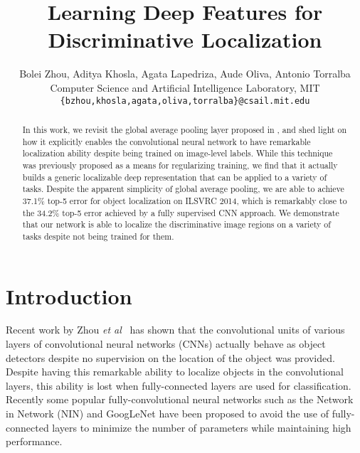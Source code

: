 \documentclass[10pt,twocolumn,letterpaper]{article}
\begin{document}
\title{Learning Deep Features for Discriminative Localization}

\author{
Bolei Zhou, Aditya Khosla, Agata Lapedriza, Aude Oliva, Antonio Torralba \\
Computer Science and Artificial Intelligence Laboratory, MIT\\
\texttt{\{bzhou,khosla,agata,oliva,torralba\}@csail.mit.edu}
}

\maketitle


\begin{abstract}

In this work, we revisit the global average pooling layer proposed in \cite{lin2013network}, and shed light on how it explicitly enables the convolutional neural network to have remarkable localization ability despite being trained on image-level labels. While this technique was previously proposed as a means for regularizing training, we find that it actually builds a generic localizable deep representation that can be applied to a variety of tasks. Despite the apparent simplicity of global average pooling, we are able to achieve 37.1\% top-5 error for object localization on ILSVRC 2014, which is remarkably close to the 34.2\% top-5 error achieved by a fully supervised CNN approach. We demonstrate that our network is able to localize the discriminative image regions on a variety of tasks despite not being trained for them.


\end{abstract}

\section{Introduction}




Recent work by Zhou \textit{et al}~\cite{zhou2014object} has shown that the convolutional units of various layers of convolutional neural networks (CNNs) actually behave as object detectors despite no supervision on the location of the object was provided. Despite having this remarkable ability to localize objects in the convolutional layers, this ability is lost when fully-connected layers are used for classification. Recently some popular fully-convolutional neural networks such as the Network in Network (NIN) \cite{lin2013network} and GoogLeNet \cite{szegedy2014going} have been proposed to avoid the use of fully-connected layers to minimize the number of parameters while maintaining high performance. 
\end{document}
